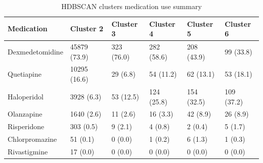 \begin{table}

\caption{HDBSCAN clusters medication use summary}
\centering
\begin{tabular}[t]{llllll}
\toprule
Medication & Cluster 2 & Cluster 3 & Cluster 4 & Cluster 5 & Cluster 6\\
\midrule
Dexmedetomidine & 45879 (73.9) & 323 (76.0) & 282 (58.6) & 208 (43.9) & 99 (33.8)\\
Quetiapine & 10295 (16.6) & 29 (6.8) & 54 (11.2) & 62 (13.1) & 53 (18.1)\\
Haloperidol & 3928 (6.3) & 53 (12.5) & 124 (25.8) & 154 (32.5) & 109 (37.2)\\
Olanzapine & 1640 (2.6) & 11 (2.6) & 16 (3.3) & 42 (8.9) & 26 (8.9)\\
Risperidone & 303 (0.5) & 9 (2.1) & 4 (0.8) & 2 (0.4) & 5 (1.7)\\
\addlinespace
Chlorpromazine & 51 (0.1) & 0 (0.0) & 1 (0.2) & 6 (1.3) & 1 (0.3)\\
Rivastigmine & 17 (0.0) & 0 (0.0) & 0 (0.0) & 0 (0.0) & 0 (0.0)\\
\bottomrule
\end{tabular}
\end{table}
